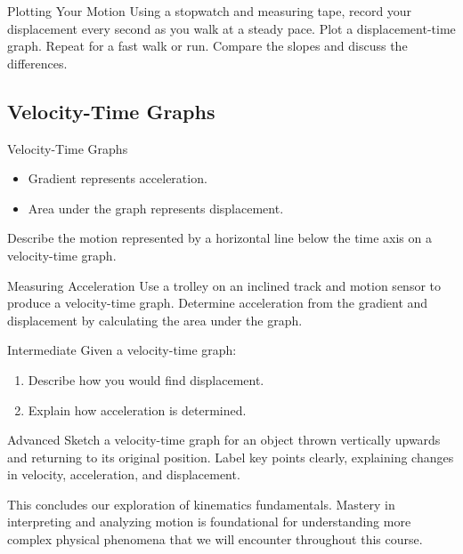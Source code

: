 \begin{investigation}{Plotting Your Motion}
Using a stopwatch and measuring tape, record your displacement every second as you walk at a steady pace. Plot a displacement-time graph. Repeat for a fast walk or run. Compare the slopes and discuss the differences.
\end{investigation}


\FloatBarrier

\subsection{Velocity-Time Graphs}
\FloatBarrier

\begin{keyconcept}{Velocity-Time Graphs}
\begin{itemize}
    \item Gradient represents acceleration.
    \item Area under the graph represents displacement.
\end{itemize}
\end{keyconcept}

\begin{stopandthink}
Describe the motion represented by a horizontal line below the time axis on a velocity-time graph.
\end{stopandthink}

\begin{investigation}{Measuring Acceleration}
Use a trolley on an inclined track and motion sensor to produce a velocity-time graph. Determine acceleration from the gradient and displacement by calculating the area under the graph.
\end{investigation}

\FloatBarrier

\begin{tieredquestions}{Intermediate}
Given a velocity-time graph:
\begin{enumerate}
    \item Describe how you would find displacement.
    \item Explain how acceleration is determined.
\end{enumerate}
\end{tieredquestions}

\begin{tieredquestions}{Advanced}
Sketch a velocity-time graph for an object thrown vertically upwards and returning to its original position. Label key points clearly, explaining changes in velocity, acceleration, and displacement.
\end{tieredquestions}


\FloatBarrier

This concludes our exploration of kinematics fundamentals. Mastery in interpreting and analyzing motion is foundational for understanding more complex physical phenomena that we will encounter throughout this course.